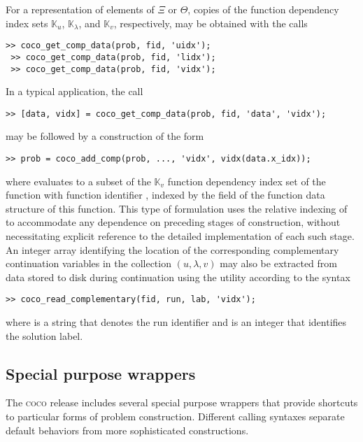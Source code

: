 For a representation of elements of $\Xi$ or $\Theta$, copies of the function dependency index sets $\mathbb{K}_u$, $\mathbb{K}_\lambda$, and $\mathbb{K}_v$, respectively, may be obtained with the calls
 \begin{lstlisting}[language=coco-highlight]
 >> coco_get_comp_data(prob, fid, 'uidx');
 >> coco_get_comp_data(prob, fid, 'lidx');
 >> coco_get_comp_data(prob, fid, 'vidx');
\end{lstlisting}
In a typical application, the call
\begin{lstlisting}[language=coco-highlight]
 >> [data, vidx] = coco_get_comp_data(prob, fid, 'data', 'vidx');
\end{lstlisting}
may be followed by a construction of the form
 \begin{lstlisting}[language=coco-highlight]
 >> prob = coco_add_comp(prob, ..., 'vidx', vidx(data.x_idx));
\end{lstlisting}
where  evaluates to a subset of the $\mathbb{K}_v$ function dependency index set of the function with function identifier , indexed by the  field of the function data structure of this function. This type of formulation uses the relative indexing of  to accommodate any dependence on preceding stages of construction, without necessitating explicit reference to the detailed implementation of each such stage. An integer array identifying the location of the corresponding complementary continuation variables in the collection $(u,\lambda,v)$ may also be extracted from data stored to disk during continuation using the  utility according to the syntax
\begin{lstlisting}[language=coco-highlight]
>> coco_read_complementary(fid, run, lab, 'vidx');
\end{lstlisting}
where  is a string that denotes the run identifier and  is an integer that identifies the solution label.    


\subsection{Special purpose wrappers}
The \textsc{coco} release includes several special purpose wrappers that provide shortcuts to particular forms of problem construction. Different calling syntaxes separate default behaviors from more sophisticated constructions.

